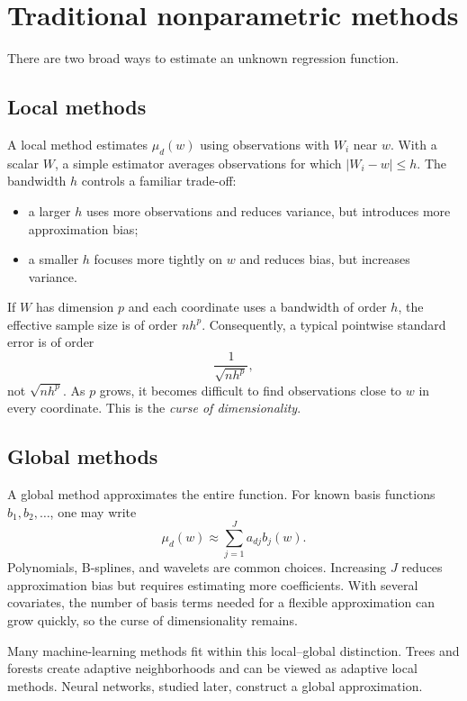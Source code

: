\section{Traditional nonparametric methods}
\label{sec:cf-nonparametrics}

There are two broad ways to estimate an unknown regression function.

\subsection{Local methods}

A local method estimates $\mu_d(w)$ using observations with $W_i$ near $w$.  With a
scalar $W$, a simple estimator averages observations for which
$|W_i-w|\leq h$.  The bandwidth $h$ controls a familiar trade-off:

\begin{itemize}
  \item a larger $h$ uses more observations and reduces variance, but introduces
  more approximation bias;
  \item a smaller $h$ focuses more tightly on $w$ and reduces bias, but increases
  variance.
\end{itemize}

If $W$ has dimension $p$ and each coordinate uses a bandwidth of order $h$, the
effective sample size is of order $nh^p$.  Consequently, a typical pointwise
standard error is of order
\begin{equation}
  \frac{1}{\sqrt{nh^p}},
  \label{eq:cf-local-se}
\end{equation}
not $\sqrt{nh^p}$.  As $p$ grows, it becomes difficult to find observations close
to $w$ in every coordinate.  This is the \emph{curse of dimensionality}.

\subsection{Global methods}

A global method approximates the entire function.  For known basis functions
$b_1,b_2,\ldots$, one may write
\[
  \mu_d(w)\approx \sum_{j=1}^{J}a_{dj}b_j(w).
\]
Polynomials, B-splines, and wavelets are common choices.  Increasing $J$ reduces
approximation bias but requires estimating more coefficients.  With several
covariates, the number of basis terms needed for a flexible approximation can grow
quickly, so the curse of dimensionality remains.

Many machine-learning methods fit within this local--global distinction.  Trees and
forests create adaptive neighborhoods and can be viewed as adaptive local methods.
Neural networks, studied later, construct a global approximation.

